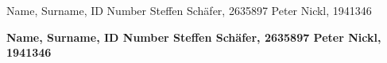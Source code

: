 \documentclass
[twoside,english,colorbacktitle,accentcolor=tud9c]
{tudexercise}
\newcommand{\studentdata}{Steffen Sch\"{a}fer, 2635897 \qquad Peter Nickl, 1941346}
\begin{document}
	
	\hwtitle{}
	\maketitle
	
	\begin{examheader}
		\normalsize
		\vspace{-1em}
		Name, Surname, ID Number \hfill \studentdata{}
		\vspace{-1em}
	\end{examheader} 
	
	\textbf{Name, Surname, ID Number \hfill \studentdata{}}

	
	
	
	
	
	
	
\end{document}
